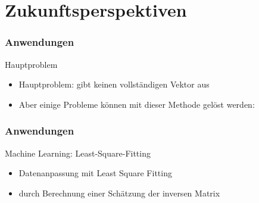 \section{Zukunftsperspektiven}


\begin{frame}
    \frametitle{Anwendungen}

    Hauptproblem
    \begin{itemize}
        \item Hauptproblem: gibt keinen vollständigen Vektor aus
        \item Aber einige Probleme können mit dieser Methode gelöst werden:
    \end{itemize}
    
\end{frame}

\begin{frame}
    \frametitle{Anwendungen}


    Machine Learning: Least-Square-Fitting
    \begin{itemize}
        \item Datenanpassung mit Least Square Fitting
        \item durch Berechnung einer Schätzung der inversen Matrix
    \end{itemize}

   \hfil



\end{frame}

